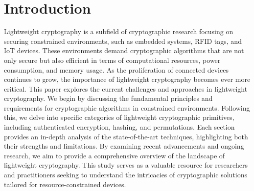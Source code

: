\section{Introduction}
Lightweight cryptography is a subfield of cryptographic research focusing on securing constrained environments, such as embedded systems, RFID tags, and IoT devices. These environments demand cryptographic algorithms that are not only secure but also efficient in terms of computational resources, power consumption, and memory usage. As the proliferation of connected devices continues to grow, the importance of lightweight cryptography becomes ever more critical.
\newline
This paper explores the current challenges and approaches in lightweight cryptography. We begin by discussing the fundamental principles and requirements for cryptographic algorithms in constrained environments. Following this, we delve into specific categories of lightweight cryptographic primitives, including authenticated encryption, hashing, and permutations. Each section provides an in-depth analysis of the state-of-the-art techniques, highlighting both their strengths and limitations.
\newline
By examining recent advancements and ongoing research, we aim to provide a comprehensive overview of the landscape of lightweight cryptography. This study serves as a valuable resource for researchers and practitioners seeking to understand the intricacies of cryptographic solutions tailored for resource-constrained devices.

